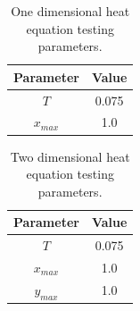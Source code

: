 \documentclass[12pt, oneside]{book}
\theoremstyle{plain}
\theoremstyle{definition}
\begin{document}
\begin{table}[h!]
\centering
 \begin{tabular}{||c c||} 
 \hline
 Parameter & Value\\ [0.5ex]
 \hline\hline
  $T$ & 0.075\\ 
  $ x_{max} $  & 1.0  \\ [1ex] 
 \hline
 \end{tabular}
 \caption{One dimensional heat equation testing parameters.}
\end{table}

\begin{table}[h!]
\centering
 \begin{tabular}{||c c||} 
 \hline
 Parameter & Value\\ [0.5ex]
 \hline\hline
  $T$ & 0.075\\ 
  $ x_{max} $  & 1.0  \\ 
   $ y_{max} $  & 1.0  \\ [1ex] 
 \hline
 \end{tabular}
 \caption{Two dimensional heat equation testing parameters.}
\end{table}
\end{document}
